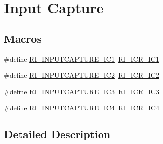 \hypertarget{group___r_i___input_capture}{\section{Input Capture}
\label{group___r_i___input_capture}
}
\subsection*{Macros}
\begin{DoxyCompactItemize}
\item 
\#define \hyperlink{group___r_i___input_capture_gaa98d1e873a27efd633af657e8b968870}{R\-I\-\_\-\-I\-N\-P\-U\-T\-C\-A\-P\-T\-U\-R\-E\-\_\-\-I\-C1}~\hyperlink{group___peripheral___registers___bits___definition_ga991a7aa3c0986605cb45831b5f16d02e}{R\-I\-\_\-\-I\-C\-R\-\_\-\-I\-C1}
\item 
\#define \hyperlink{group___r_i___input_capture_gabfeb9d558e0b2be2376a8de7bba47c6f}{R\-I\-\_\-\-I\-N\-P\-U\-T\-C\-A\-P\-T\-U\-R\-E\-\_\-\-I\-C2}~\hyperlink{group___peripheral___registers___bits___definition_ga5430845f1a57feef529bae0704c56968}{R\-I\-\_\-\-I\-C\-R\-\_\-\-I\-C2}
\item 
\#define \hyperlink{group___r_i___input_capture_gaa6898cb4fe4fa9c7c8f1575dacde0200}{R\-I\-\_\-\-I\-N\-P\-U\-T\-C\-A\-P\-T\-U\-R\-E\-\_\-\-I\-C3}~\hyperlink{group___peripheral___registers___bits___definition_ga02a8c41438b820e6909a8a44311d2d2e}{R\-I\-\_\-\-I\-C\-R\-\_\-\-I\-C3}
\item 
\#define \hyperlink{group___r_i___input_capture_ga0fbcaaee4c38c255c923397053db8013}{R\-I\-\_\-\-I\-N\-P\-U\-T\-C\-A\-P\-T\-U\-R\-E\-\_\-\-I\-C4}~\hyperlink{group___peripheral___registers___bits___definition_gacaf8eea8686232d8e0e04d3c07526883}{R\-I\-\_\-\-I\-C\-R\-\_\-\-I\-C4}
\end{DoxyCompactItemize}


\subsection{Detailed Description}



